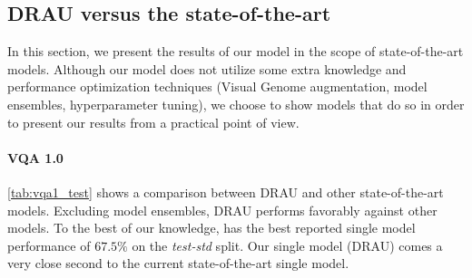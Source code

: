 \documentclass[times,twocolumn, final ,authoryear]{elsarticle}
\begin{document}
  	
  
  \subsection{DRAU versus the state-of-the-art}
  
  In this section, we present the results of our model in the scope of state-of-the-art models. Although our model does not utilize some extra knowledge and performance optimization techniques (Visual Genome augmentation, model ensembles, hyperparameter tuning), we choose to show models that do so in order to present our results from a practical point of view. 
  
  \paragraph{VQA 1.0} \cref{tab:vqa1_test} shows a comparison between DRAU and other state-of-the-art models. Excluding model ensembles, DRAU performs favorably against other models. To the best of our knowledge, \cite{yu2017} has the best reported single model performance of $67.5\%$ on the \textit{test-std} split. Our single model (DRAU) comes a very close second to the current state-of-the-art single model.
  
\end{document}
